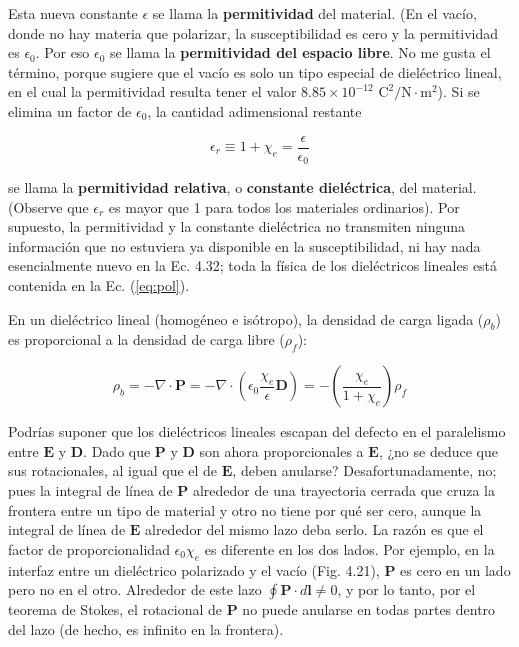 \documentclass[12pt,a4paper]{report}
\newcommand{\esp}{\vspace{0.5cm}}
\begin{document}
	Esta nueva constante $\epsilon$ se llama la \textbf{permitividad} del material. (En el vacío, donde no hay materia que polarizar, la susceptibilidad es cero y la permitividad es $\epsilon_0$. Por eso $\epsilon_0$ se llama la \textbf{permitividad del espacio libre}. No me gusta el término, porque sugiere que el vacío es solo un tipo especial de dieléctrico lineal, en el cual la permitividad resulta tener el valor $8.85 \times 10^{-12} \text{ C}^2/\text{N}\cdot\text{m}^2$). Si se elimina un factor de $\epsilon_0$, la cantidad adimensional restante
	
	\esp
	
	\begin{equation}
		\epsilon_r \equiv 1 + \chi_e = \frac{\epsilon}{\epsilon_0}
	\end{equation}
	
	\esp
	
	se llama la \textbf{permitividad relativa}, o \textbf{constante dieléctrica}, del material. (Observe que $\epsilon_r$ es mayor que 1 para todos los materiales ordinarios). Por supuesto, la permitividad y la constante dieléctrica no transmiten ninguna información que no estuviera ya disponible en la susceptibilidad, ni hay nada esencialmente nuevo en la Ec. 4.32; toda la física de los dieléctricos lineales está contenida en la Ec. (\ref{eq:pol}).
	
	\esp
	
	En un dieléctrico lineal (homogéneo e isótropo), la densidad de carga ligada ($\rho_b$) es proporcional a la densidad de carga libre ($\rho_f$):
	
	\esp
	
	\begin{equation}
		\rho_b = -\nabla \cdot \mathbf{P} = -\nabla \cdot \left(\epsilon_0 \frac{\chi_e}{\epsilon} \mathbf{D}\right) = - \left( \frac{\chi_e}{1 + \chi_e} \right) \rho_f
	\end{equation}
	
	\esp
	
	Podrías suponer que los dieléctricos lineales escapan del defecto en el paralelismo entre $\mathbf{E}$ y $\mathbf{D}$. Dado que $\mathbf{P}$ y $\mathbf{D}$ son ahora proporcionales a $\mathbf{E}$, ¿no se deduce que sus rotacionales, al igual que el de $\mathbf{E}$, deben anularse? Desafortunadamente, no; pues la integral de línea de $\mathbf{P}$ alrededor de una trayectoria cerrada que cruza la frontera entre un tipo de material y otro no tiene por qué ser cero, aunque la integral de línea de $\mathbf{E}$ alrededor del mismo lazo deba serlo. La razón es que el factor de proporcionalidad $\epsilon_0 \chi_e$ es diferente en los dos lados. Por ejemplo, en la interfaz entre un dieléctrico polarizado y el vacío (Fig. 4.21), $\mathbf{P}$ es cero en un lado pero no en el otro. Alrededor de este lazo $\oint \mathbf{P} \cdot d\mathbf{l} \neq 0$, y por lo tanto, por el teorema de Stokes, el rotacional de $\mathbf{P}$ no puede anularse en todas partes dentro del lazo (de hecho, es infinito en la frontera).
	
\end{document}
